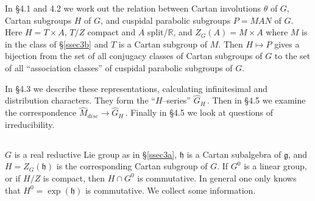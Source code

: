 \documentclass{conm-p-l}
\renewcommand{\gg}{\mathfrak{g}}
\def\gg{\mathfrak{g}}
\def\gh{\mathfrak{h}}
\def\R{\mathbb{R}}
\begin{document}
In \S 4.1 and 4.2 we work out the relation between Cartan involutions
$\theta$ of $G$, Cartan subgroups $H$ of $G$, and cuspidal parabolic
subgroups $P=MAN$ of $G$.  Here $H = T\times A$, $T/Z$ compact and 
$A$ split/$\R$, and $Z_G(A) = M\times A$ where $M$ is in the class of
\S\ref{ssec3b} and $T$ is a Cartan subgroup of $M$.  Then $H \mapsto P$
gives a bijection from the set of all 
conjugacy classes of Cartan subgroups of $G$ to the set of all 
``association classes'' of cuspidal parabolic subgroups of $G$.

In \S 4.3 we describe these representations, calculating infinitesimal and
distribution characters.  They form the ``$H$--series'' $\widehat{G}_H$\,.  
Then in \S 4.5  we examine the correspondence 
$\widehat{M}_{disc} \to \widehat{G}_H$\,.  Finally in \S 4.5 we look at
questions of irreducibility.

\subsection{}\label{ssec4a}\setcounter{equation}{0}
$G$ is a real reductive Lie group as in \S \ref{ssec3a}, $\gh$ is a Cartan
subalgebra of $\gg$, and $H = Z_G(\gh)$ is the corresponding Cartan
subgroup of $G$.  If $G^0$ is a linear group, or if $H/Z$ is compact, then
$H \cap G^0$ is commutative.  In general one only knows that $H^0 = 
\exp(\gh)$ is commutative.  We collect some information.
\end{document}
